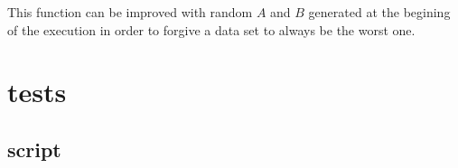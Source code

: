 \documentclass[a4paper, 12pts]{article}
\begin{document}
	This function can be improved with random $A$ and $B$ generated at the begining of the execution in order to forgive a data set to always be the worst one.

\section{tests}

\subsection{script}
\end{document}
